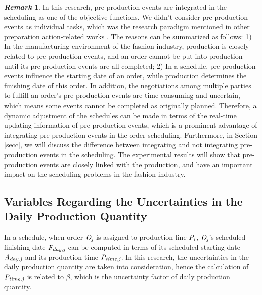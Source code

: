 \documentclass[journal]{IEEEtran}
\theoremstyle{definition}
\newtheorem{remark}{\it Remark}
\begin{document}
\begin{remark}
In this research, pre-production events are integrated in the scheduling as one of the objective functions. We didn't consider pre-production events as individual tasks, which was the research paradigm mentioned in other preparation action-related works \cite{berger2004many,sawik2014joint}. The reasons can be summarized as follows: 1) In the manufacturing environment of the fashion industry, production is closely related to pre-production events, and an order cannot be put into production until its pre-production events are all completed; 2) In a schedule, pre-production events influence the starting date of an order, while production determines the finishing date of this order.
In addition, the negotiations among multiple parties to fulfill an order's pre-production events are time-consuming and uncertain, which means some events cannot be completed as originally planned. Therefore, a dynamic adjustment of the schedules can be made in terms of the real-time updating information of pre-production events, which is a prominent advantage of integrating pre-production events in the order scheduling. Furthermore, in Section \ref{secc}, we will discuss the difference between integrating and not integrating pre-production events in the scheduling. The experimental results will show that pre-production events are closely linked with the production, and have an important impact on the scheduling problems in the fashion industry.
\end{remark}

\subsection{Variables Regarding the Uncertainties in the Daily Production Quantity}
In a schedule, when order $\emph{O}_\emph{j}$ is assigned to production line $\emph{P}_\emph{i}$, $\emph{O}_\emph{j}$'s scheduled finishing date $\emph{F}_\emph{day,j}$ can be computed in terms of its scheduled starting date $\emph{A}_\emph{day,j}$ and its production time $\emph{P}_\emph{time,j}$. In this research, the uncertainties in the daily production quantity are taken into consideration, hence the calculation of $\emph{P}_\emph{time,j}$ is related to $\beta$, which is the uncertainty factor of daily production quantity.
\end{document}
